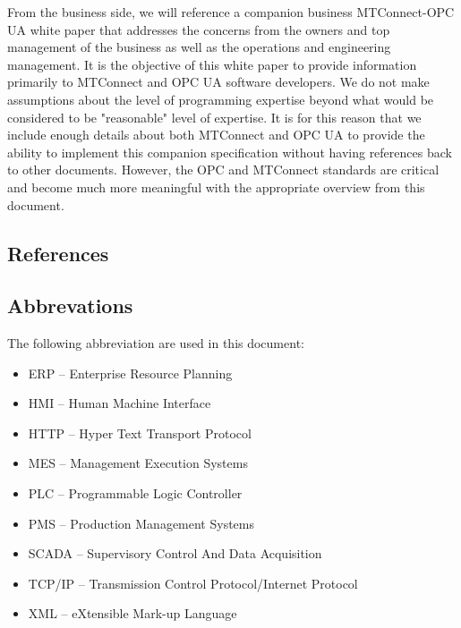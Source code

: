 From the business side, we will reference a companion business MTConnect-OPC UA white paper that addresses the concerns from the owners and top management of the business as well as the operations and engineering management. It is the objective of this white paper to provide information primarily to MTConnect and OPC UA software developers. We do not make assumptions about the level of programming expertise beyond what would be considered to be "reasonable" level of expertise. It is for this reason that we include enough details about both MTConnect and OPC UA to provide the ability to implement this companion specification without having references back to other documents. However, the OPC and MTConnect standards are critical and become much more meaningful with the appropriate overview from this document.

\subsection{References}

\printbibliography[title=OPC UA References,keyword=OPC]

\printbibliography[title=MTConnect References,keyword=MTC]

\printbibliography[title=Other References,notkeyword=MTC,notkeyword=OPC]

\subsection{Abbrevations}

The following abbreviation are used in this document:

\begin{itemize}
    \item ERP -- Enterprise Resource Planning
    \item HMI -- Human Machine Interface
    \item HTTP -- Hyper Text Transport Protocol
    \item MES -- Management Execution Systems
    \item PLC -- Programmable Logic Controller
    \item PMS -- Production Management Systems
    \item SCADA -- Supervisory Control And Data Acquisition
    \item TCP/IP -- Transmission Control Protocol/Internet Protocol
    \item XML -- eXtensible Mark-up Language
\end{itemize}

